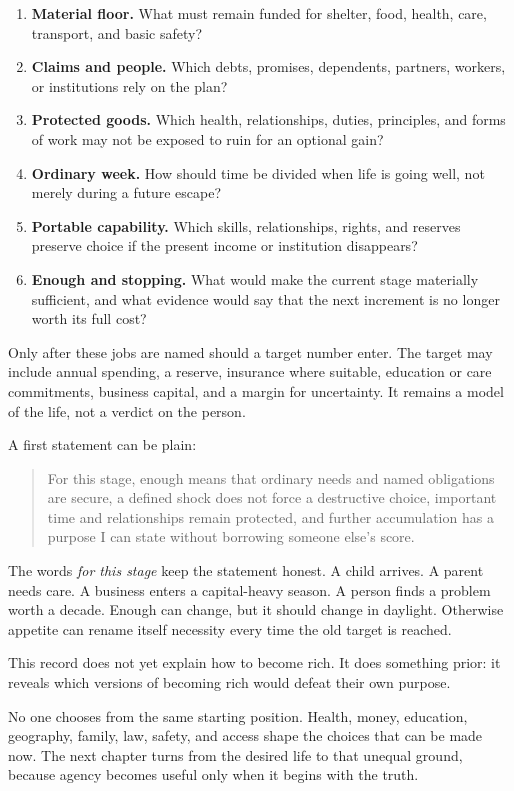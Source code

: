 \begin{enumerate}
\item \textbf{Material floor.} What must remain funded for shelter, food,
  health, care, transport, and basic safety?
\item \textbf{Claims and people.} Which debts, promises, dependents, partners,
  workers, or institutions rely on the plan?
\item \textbf{Protected goods.} Which health, relationships, duties,
  principles, and forms of work may not be exposed to ruin for an optional
  gain?
\item \textbf{Ordinary week.} How should time be divided when life is going
  well, not merely during a future escape?
\item \textbf{Portable capability.} Which skills, relationships, rights, and
  reserves preserve choice if the present income or institution disappears?
\item \textbf{Enough and stopping.} What would make the current stage
  materially sufficient, and what evidence would say that the next increment
  is no longer worth its full cost?
\end{enumerate}

Only after these jobs are named should a target number enter. The target may
include annual spending, a reserve, insurance where suitable, education or
care commitments, business capital, and a margin for uncertainty. It remains
a model of the life, not a verdict on the person.

A first statement can be plain:

\begin{quote}
\small
For this stage, enough means that ordinary needs and named obligations are
secure, a defined shock does not force a destructive choice, important time
and relationships remain protected, and further accumulation has a purpose I
can state without borrowing someone else's score.
\end{quote}

The words \emph{for this stage} keep the statement honest. A child arrives. A
parent needs care. A business enters a capital-heavy season. A person finds a
problem worth a decade. Enough can change, but it should change in daylight.
Otherwise appetite can rename itself necessity every time the old target is
reached.

This record does not yet explain how to become rich. It does something prior:
it reveals which versions of becoming rich would defeat their own purpose.

No one chooses from the same starting position. Health, money, education,
geography, family, law, safety, and access shape the choices that can be made
now. The next chapter turns from the desired life to that unequal ground,
because agency becomes useful only when it begins with the truth.

